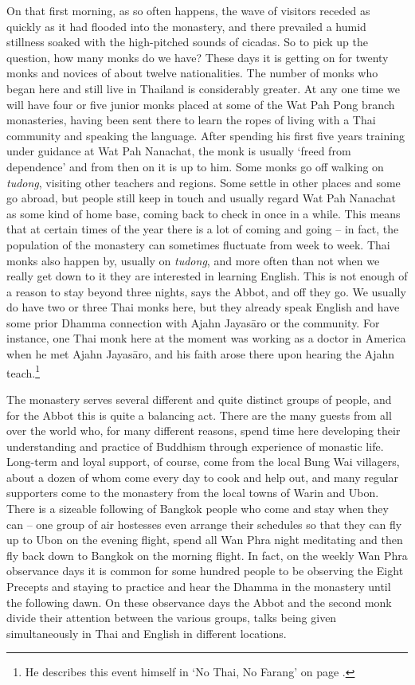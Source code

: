 On that first morning, as so often happens, the wave of visitors receded
as quickly as it had flooded into the monastery, and there prevailed a
humid stillness soaked with the high-pitched sounds of cicadas. So to
pick up the question, how many monks do we have? These days it is
getting on for twenty monks and novices of about twelve nationalities. 
The number of monks who began here and still live in Thailand is
considerably greater. At any one time we will have four or five junior
monks placed at some of the Wat Pah Pong branch monasteries, having been
sent there to learn the ropes of living with a Thai community and speaking
the language. After spending his first five years training under
guidance at Wat Pah Nanachat, the monk is usually `freed from
dependence' and from then on it is up to him. Some monks go off walking
on \emph{tudong}, visiting other teachers and regions. Some settle in
other places and some go abroad, but people still keep in touch and
usually regard Wat Pah Nanachat as some kind of home base, coming back
to check in once in a while. This means that at certain times of the
year there is a lot of coming and going -- in fact, the population of
the monastery can sometimes fluctuate from week to week. Thai monks also
happen by, usually on \emph{tudong}, and more often than not when we
really get down to it they are interested in learning English. This is
not enough of a reason to stay beyond three nights, says the Abbot, and
off they go. We usually do have two or three Thai monks here, but they
already speak English and have some prior Dhamma connection with Ajahn
Jayasāro or the community. For instance, one Thai monk here at the
moment was working as a doctor in America when he met Ajahn Jayasāro, 
and his faith arose there upon hearing the Ajahn teach.\footnote{He
  describes this event himself in `No Thai, No Farang' on page \pageref{no-thai-no-farang}.}

The monastery serves several different and quite distinct groups of
people, and for the Abbot this is quite a balancing act. There are the
many guests from all over the world who, for many different reasons, 
spend time here developing their understanding and practice of Buddhism
through experience of monastic life. Long-term and loyal support, of
course, come from the local Bung Wai villagers, about a dozen of whom
come every day to cook and help out, and many regular supporters come to
the monastery from the local towns of Warin and Ubon. There is a
sizeable following of Bangkok people who come and stay when they can --
one group of air hostesses even arrange their schedules so that they can
fly up to Ubon on the evening flight, spend all Wan Phra night
meditating and then fly back down to Bangkok on the morning flight. In
fact, on the weekly Wan Phra observance days it is common for some
hundred people to be observing the Eight Precepts and staying to
practice and hear the Dhamma in the monastery until the following dawn. 
On these observance days the Abbot and the second monk divide their
attention between the various groups, talks being given simultaneously
in Thai and English in different locations. 

